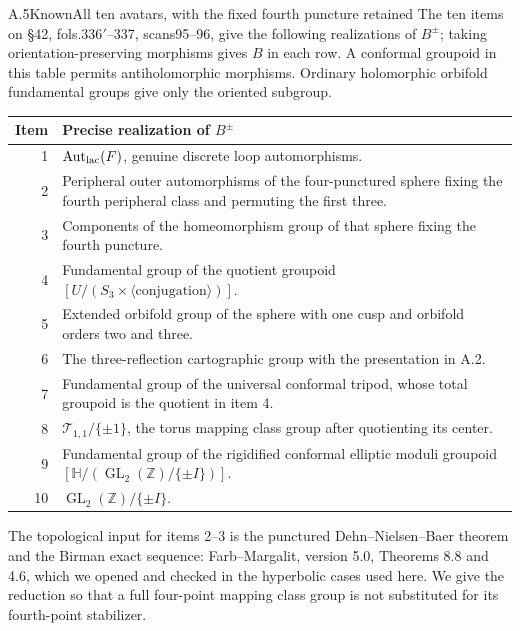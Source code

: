 \begin{claim}{A.5}{Known}{All ten avatars, with the fixed fourth puncture retained}
The ten items on \S42, fols.336$'$--337, scans95--96, give the following realizations of $B^\pm$; taking orientation-preserving morphisms gives $B$ in each row. A conformal groupoid in this table permits antiholomorphic morphisms. Ordinary holomorphic orbifold fundamental groups give only the oriented subgroup.
\begin{center}\small
\begin{tabular}{rp{}}
\toprule
Item&Precise realization of $B^\pm$\\\midrule
1&$\operatorname{Aut}_{\rm lac}(F)$, genuine discrete loop automorphisms.\\
2&Peripheral outer automorphisms of the four-punctured sphere fixing the fourth peripheral class and permuting the first three.\\
3&Components of the homeomorphism group of that sphere fixing the fourth puncture.\\
4&Fundamental group of the quotient groupoid $[U/(S_3\times\langle\text{conjugation}\rangle)]$.\\
5&Extended orbifold group of the sphere with one cusp and orbifold orders two and three.\\
6&The three-reflection cartographic group with the presentation in A.2.\\
7&Fundamental group of the universal conformal tripod, whose total groupoid is the quotient in item 4.\\
8&$\mathcal T_{1,1}/\{\pm1\}$, the torus mapping class group after quotienting its center.\\
9&Fundamental group of the rigidified conformal elliptic moduli groupoid $[\mathbb H/(\operatorname{GL}_2(\mathbb Z)/\{\pm I\})]$.\\
10&$\operatorname{GL}_2(\mathbb Z)/\{\pm I\}$.\\\bottomrule
\end{tabular}\end{center}
The topological input for items 2--3 is the punctured Dehn--Nielsen--Baer theorem and the Birman exact sequence: Farb--Margalit, version 5.0, Theorems 8.8 and 4.6, which we opened and checked in the hyperbolic cases used here. We give the reduction so that a full four-point mapping class group is not substituted for its fourth-point stabilizer.
\end{claim}
